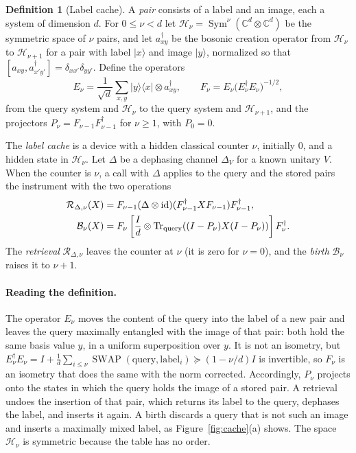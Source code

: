 \documentclass[11pt,letterpaper]{article}
\theoremstyle{definition}\newtheorem{definition}[theorem]{Definition}
\newcommand{\C}{\mathbb C}
\newcommand{\Tr}{\operatorname{Tr}}
\newcommand{\ket}[1]{\lvert#1\rangle}
\newcommand{\bra}[1]{\langle#1\rvert}
\newcommand{\id}{\operatorname{id}}
\newcommand{\reffig}[1]{Figure~\ref{#1}}
\begin{document}
\begin{definition}[Label cache]\label{def:cache}
A \emph{pair} consists of a label and an image, each a system of
dimension $d$. For $0\le\nu<d$ let
$\mathcal H_\nu=\operatorname{Sym}^\nu(\C^d\otimes\C^d)$ be the
symmetric space of $\nu$ pairs, and let $a^\dagger_{xy}$ be the bosonic
creation operator from $\mathcal H_\nu$ to $\mathcal H_{\nu+1}$ for a
pair with label $\ket x$ and image $\ket y$, normalized so that
$[a_{xy},a^\dagger_{x'y'}]=\delta_{xx'}\delta_{yy'}$. Define the
operators
\[
 E_\nu=\frac1{\sqrt d}\sum_{x,y}\ket y\bra x\otimes a^\dagger_{xy},
 \qquad
 F_\nu=E_\nu\bigl(E_\nu^\dagger E_\nu\bigr)^{-1/2},
\]
from the query system and $\mathcal H_\nu$ to the query system and
$\mathcal H_{\nu+1}$, and the projectors
$P_\nu=F_{\nu-1}F_{\nu-1}^\dagger$ for $\nu\ge1$, with $P_0=0$.

The \emph{label cache} is a device with a hidden classical counter
$\nu$, initially $0$, and a hidden state in $\mathcal H_\nu$. Let
$\Delta$ be a dephasing channel $\Delta_V$ for a known unitary $V$.
When the counter is $\nu$, a call with $\Delta$ applies to the query
and the stored pairs the instrument with the two operations
\begin{equation}\label{eq:c6-cache}
\begin{aligned}
 \mathcal R_{\Delta,\nu}(X)
 &=F_{\nu-1}(\Delta\otimes\id)
       (F_{\nu-1}^\dagger XF_{\nu-1})F_{\nu-1}^\dagger,\\
 \mathcal B_\nu(X)
 &=F_\nu\left[\frac Id\otimes\Tr_{\rm query}
       ((I-P_\nu)X(I-P_\nu))\right]F_\nu^\dagger.
\end{aligned}
\end{equation}
The \emph{retrieval} $\mathcal R_{\Delta,\nu}$ leaves the counter at
$\nu$ (it is zero for $\nu=0$), and the \emph{birth} $\mathcal B_\nu$
raises it to $\nu+1$.
\end{definition}

\paragraph{Reading the definition.}
The operator $E_\nu$ moves the content of the query into the label of a
new pair and leaves the query maximally entangled with the image of
that pair: both hold the same basis value $y$, in a uniform
superposition over $y$. It is not an isometry, but
$E_\nu^\dagger E_\nu=I+\frac1d\sum_{i\le\nu}
\operatorname{SWAP}(\text{query},\text{label}_i)\succeq(1-\nu/d)I$ is
invertible, so $F_\nu$ is an isometry that does the same with the norm
corrected. Accordingly, $P_\nu$ projects onto the states in which the
query holds the image of a stored pair. A retrieval undoes the
insertion of that pair, which returns its label to the query, dephases
the label, and inserts it again. A birth discards a query that is not
such an image and inserts a maximally mixed label, as
\reffig{fig:cache}(a) shows. The space $\mathcal H_\nu$ is symmetric
because the table has no order.
\end{document}
